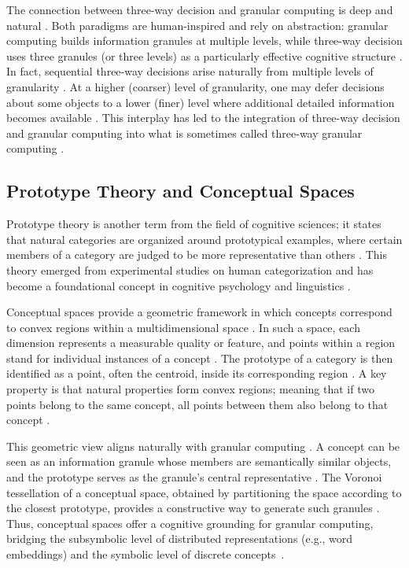 \documentclass[a4paper,twoside,12pt]{book}
\begin{document}
The connection between three-way decision and granular computing is deep and natural \cite{Fujita2016threeway, Yao2018threeway}. Both paradigms are human-inspired and rely on abstraction: granular computing builds information granules at multiple levels, while three-way decision uses three granules (or three levels) as a particularly effective cognitive structure \cite{Yao2018threeway}. In fact, sequential three-way decisions arise naturally from multiple levels of granularity \cite{Fujita2016threeway}. At a higher (coarser) level of granularity, one may defer decisions about some objects to a lower (finer) level where additional detailed information becomes available \cite{Fujita2016threeway}. This interplay has led to the integration of three-way decision and granular computing into what is sometimes called three-way granular computing \cite{Fujita2016threeway, Yao2018threeway}.

\subsection{Prototype Theory and Conceptual Spaces}

Prototype theory is another term from the field of cognitive sciences; it states that natural categories are organized around prototypical examples, where certain members of a category are judged to be more representative than others \cite{DeSantis2023prototype}. This theory emerged from experimental studies on human categorization and has become a foundational concept in cognitive psychology and linguistics \cite{DeSantis2023prototype}. 

Conceptual spaces provide a geometric framework in which concepts correspond to convex regions within a multidimensional space \cite{DeSantis2023prototype}. In such a space, each dimension represents a measurable quality or feature, and points within a region stand for individual instances of a concept \cite{DeSantis2023prototype}. The prototype of a category is then identified as a point, often the centroid, inside its corresponding region \cite{DeSantis2023prototype}. A key property is that natural properties form convex regions; meaning that if two points belong to the same concept, all points between them also belong to that concept \cite{DeSantis2023prototype}.

This geometric view aligns naturally with granular computing \cite{DeSantis2023prototype}. A concept can be seen as an information granule whose members are semantically similar objects, and the prototype serves as the granule's central representative \cite{DeSantis2023prototype}. The Voronoi tessellation of a conceptual space, obtained by partitioning the space according to the closest prototype, provides a constructive way to generate such granules \cite{DeSantis2023prototype}. Thus, conceptual spaces offer a cognitive grounding for granular computing, bridging the subsymbolic level of distributed representations (e.g., word embeddings) and the symbolic level of discrete concepts~\cite{DeSantis2023prototype}.
\end{document}
